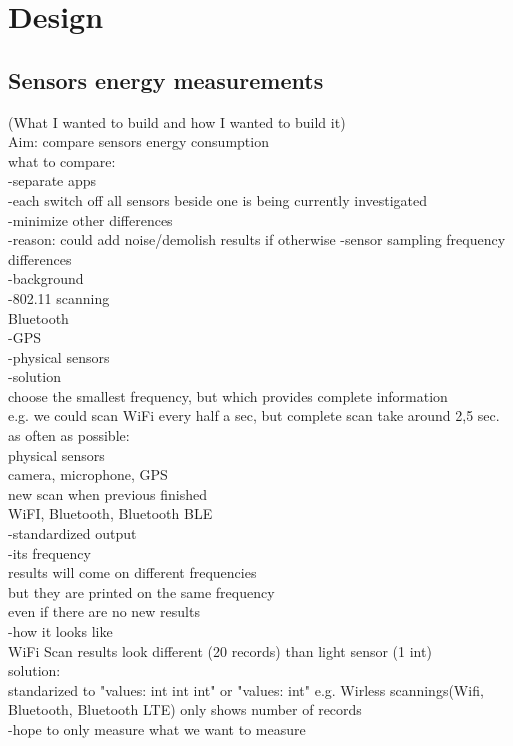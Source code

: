 \section{Design}
\label{s:design}
\subsection{Sensors energy measurements}

(What I wanted to build and how I wanted to build it)\\

Aim: compare sensors energy consumption\\

what to compare:\\
	-separate apps\\
	-each switch off all sensors beside one is being currently investigated\\
	-minimize other differences \\
		-reason: could add noise/demolish results  if otherwise
		-sensor sampling frequency differences\\
			-background\\
				-802.11 scanning\\
					Bluetooth\\
				-GPS\\
				-physical sensors\\
			-solution\\
				choose the smallest frequency, but which provides complete information\\
					e.g. we could scan WiFi every half a sec, but complete scan take around 2,5 sec.\\
				as often as possible:\\
					physical sensors\\
					camera, microphone, GPS\\	
				new scan when previous finished\\
					WiFI, Bluetooth, Bluetooth BLE\\
		-standardized output\\
				-its frequency\\
					results will come on different frequencies\\
					but they are printed on the same frequency\\
						even if there are no new results\\
				-how it looks like\\
					WiFi Scan results look different (20 records) than light sensor (1 int)\\
					solution:\\
						standarized to "values: int int int" or "values: int"
							e.g. Wirless scannings(Wifi, Bluetooth, Bluetooth LTE) only shows number of records\\
		-hope to only measure what we want to measure\\				
				
